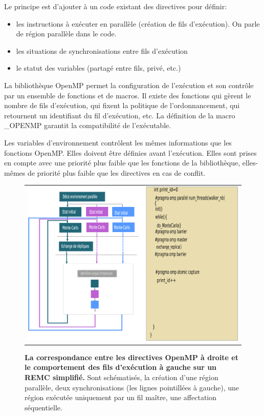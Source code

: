 Le principe est d'ajouter à un code existant des directives pour définir:

\begin{itemize}
\item les instructions à exécuter en parallèle (création de fils d'exécution). On parle de région parallèle dans le code.
\item les situations de synchronisations entre fils d'exécution
\item le statut des variables (partagé entre fils, privé, etc.) 
\end{itemize}

La bibliothèque OpenMP permet la configuration de l'exécution et son contrôle par un ensemble de fonctions et de macros. Il existe des fonctions qui gèrent le nombre de fils d'exécution, qui fixent la politique de l'ordonnancement, qui retournent un identifiant du fil d'exécution, etc. La définition de la macro \_OPENMP garantit la compatibilité de l'exécutable.

Les variables d'environnement contrôlent les mêmes informations que les fonctions OpenMP. Elles doivent être définies avant l'exécution. Elles sont prises en compte avec une priorité plus faible que les fonctions de la bibliothèque, elles-mêmes de priorité plus faible que les directives en cas de conflit.

   \begin{figure}[!htbp]
     \centering
     \begin{tabular}{c}
       \includegraphics[width=16cm]{figure/openMP.png} 
     \end{tabular}     
     \caption{\textbf{La correspondance entre les directives OpenMP à droite et le comportement des fils d'exécution à gauche sur un REMC simplifié.} Sont schématisés, la création d'une région parallèle, deux synchronisations (les lignes pointillées à gauche), une région exécutée uniquement par un fil maître, une affectation séquentielle. }
\label{fig:openMP}
   \end{figure}


